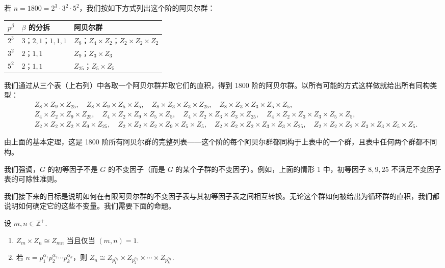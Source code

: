 \begin{example}
若 \(n = 1800 = 2^3 \cdot 3^2 \cdot 5^2\)，我们按如下方式列出这个阶的阿贝尔群：

\begin{center}
\begin{tabular}{lll}
\hline
\(p^\beta\) & \(\beta\) 的分拆 & 阿贝尔群 \\
\hline
\(2^3\) & \(3\)；\(2, 1\)；\(1, 1, 1\) & \(Z_8\)；\(Z_4 \times Z_2\)；\(Z_2 \times Z_2 \times Z_2\) \\
\(3^2\) & \(2\)；\(1, 1\) & \(Z_9\)；\(Z_3 \times Z_3\) \\
\(5^2\) & \(2\)；\(1, 1\) & \(Z_{25}\)；\(Z_5 \times Z_5\) \\
\hline
\end{tabular}
\end{center}

我们通过从三个表（上右列）中各取一个阿贝尔群并取它们的直积，得到 1800 阶的阿贝尔群。以所有可能的方式这样做就给出所有同构类型：
\[
\begin{aligned}
&Z_8 \times Z_9 \times Z_{25},\quad Z_8 \times Z_9 \times Z_5 \times Z_5,\quad Z_8 \times Z_3 \times Z_3 \times Z_{25},\quad Z_8 \times Z_3 \times Z_3 \times Z_5 \times Z_5, \\
&Z_4 \times Z_2 \times Z_9 \times Z_{25},\quad Z_4 \times Z_2 \times Z_9 \times Z_5 \times Z_5,\quad Z_4 \times Z_2 \times Z_3 \times Z_3 \times Z_{25},\quad Z_4 \times Z_2 \times Z_3 \times Z_3 \times Z_5 \times Z_5, \\
&Z_2 \times Z_2 \times Z_2 \times Z_9 \times Z_{25},\quad Z_2 \times Z_2 \times Z_2 \times Z_9 \times Z_5 \times Z_5,\quad Z_2 \times Z_2 \times Z_2 \times Z_3 \times Z_3 \times Z_{25},\quad Z_2 \times Z_2 \times Z_2 \times Z_3 \times Z_3 \times Z_5 \times Z_5.
\end{aligned}
\]

由上面的基本定理，这是 1800 阶所有阿贝尔群的完整列表——这个阶的每个阿贝尔群都同构于上表中的一个群，且表中任何两个群都不同构。
\end{example}

我们强调，\(G\) 的初等因子不是 \(G\) 的不变因子（而是 \(G\) 的某个子群的不变因子）。例如，上面的情形 1 中，初等因子 \(8, 9, 25\) 不满足不变因子表的可除性准则。

我们接下来的目标是说明如何在有限阿贝尔群的不变因子表与其初等因子表之间相互转换。无论这个群如何被给出为循环群的直积，我们都说明如何确定它的这些不变量。我们需要下面的命题。

\begin{proposition}\label{pro:5.6}
设 \(m, n \in \mathbb{Z}^+\).

\begin{enumerate}[label=(\arabic*)]
\item \(Z_m \times Z_n \cong Z_{mn}\) 当且仅当 \((m, n) = 1\).
\item 若 \(n = p_1^{\alpha_1} p_2^{\alpha_2} \cdots p_k^{\alpha_k}\)，则 \(Z_n \cong Z_{p_1^{\alpha_1}} \times Z_{p_2^{\alpha_2}} \times \cdots \times Z_{p_k^{\alpha_k}}\).
\end{enumerate}
\end{proposition}

